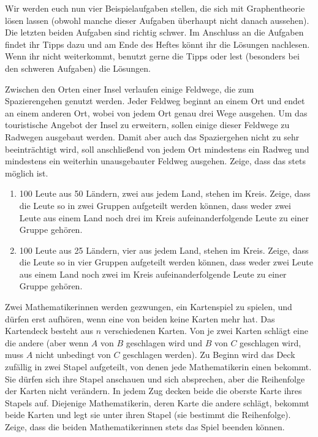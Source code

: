 Wir werden euch nun vier Beispielaufgaben stellen, die sich mit Graphentheorie lösen lassen (obwohl manche dieser Aufgaben überhaupt nicht danach aussehen). Die letzten beiden Aufgaben sind richtig schwer. Im Anschluss an die Aufgaben findet ihr Tipps dazu und am Ende des Heftes könnt ihr die Lösungen nachlesen. Wenn ihr nicht weiterkommt, benutzt gerne die Tipps oder lest (besonders bei den schweren Aufgaben) die Lösungen.
\begin{aufgabe*}\label{aufgabe:Feldwege}
	Zwischen den Orten einer Insel verlaufen einige Feldwege, die zum Spazierengehen genutzt werden. Jeder Feldweg beginnt an einem Ort und endet an einem anderen Ort, wobei von jedem Ort genau drei Wege ausgehen. Um das touristische Angebot der Insel zu erweitern, sollen einige dieser Feldwege zu Radwegen ausgebaut werden. Damit aber auch das Spaziergehen nicht zu sehr beeinträchtigt wird, soll anschließend von jedem Ort mindestens ein Radweg und mindestens ein weiterhin unausgebauter Feldweg ausgehen. Zeige, dass das stets möglich ist.
\end{aufgabe*}
\begin{aufgabe*}\label{aufgabe:50Laender}\leavevmode
	\begin{enumerate}
		\item 100 Leute aus 50 Ländern, zwei aus jedem Land, stehen im Kreis. Zeige, dass die Leute so in zwei Gruppen aufgeteilt werden können, dass weder zwei Leute aus einem Land noch drei im Kreis aufeinanderfolgende Leute zu einer Gruppe gehören.\label{teilaufgabe:50}
		\item 100 Leute aus 25 Ländern, vier aus jedem Land, stehen im Kreis. Zeige, dass die Leute so in vier Gruppen aufgeteilt werden können, dass weder zwei Leute aus einem Land noch zwei im Kreis aufeinanderfolgende Leute zu einer Gruppe gehören.\label{teilaufgabe:25}
	\end{enumerate}
\end{aufgabe*}
\begin{aufgabe*}[**]\label{aufgabe:Kartenspiel}
	Zwei Mathematikerinnen werden gezwungen, ein Kartenspiel zu spielen, und dürfen erst aufhören, wenn eine von beiden keine Karten mehr hat. Das Kartendeck besteht aus $n$ verschiedenen Karten. Von je zwei Karten schlägt eine die andere (aber wenn $A$ von $B$ geschlagen wird und $B$ von $C$ geschlagen wird, muss $A$ nicht unbedingt von $C$ geschlagen werden). Zu Beginn wird das Deck zufällig in zwei Stapel aufgeteilt, von denen jede Mathematikerin einen bekommt. Sie dürfen sich ihre Stapel anschauen und sich absprechen, aber die Reihenfolge der Karten nicht verändern. In jedem Zug decken beide die oberste Karte ihres Stapels auf. Diejenige Mathematikerin, deren Karte die andere schlägt, bekommt beide Karten und legt sie unter ihren Stapel (sie bestimmt die Reihenfolge). Zeige, dass die beiden Mathematikerinnen stets das Spiel beenden können.
\end{aufgabe*}

